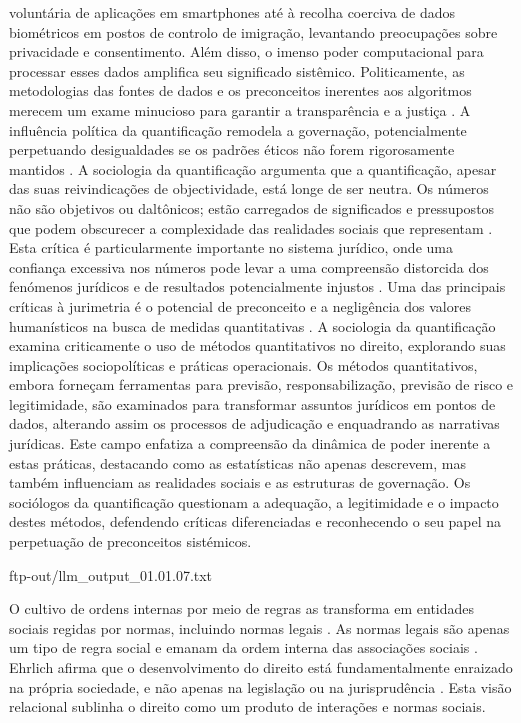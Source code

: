 voluntária de aplicações em smartphones até à recolha coerciva de dados biométricos em postos de controlo de imigração, levantando preocupações sobre privacidade e consentimento. Além disso, o imenso poder computacional para processar esses dados amplifica seu significado sistêmico. Politicamente, as metodologias das fontes de dados e os preconceitos inerentes aos algoritmos merecem um exame minucioso para garantir a transparência e a justiça \cite{sareen2020}. A influência política da quantificação remodela a governação, potencialmente perpetuando desigualdades se os padrões éticos não forem rigorosamente mantidos \cite{camargo2022}. A sociologia da quantificação argumenta que a quantificação, apesar das suas reivindicações de objectividade, está longe de ser neutra. Os números não são objetivos ou daltônicos; estão carregados de significados e pressupostos que podem obscurecer a complexidade das realidades sociais que representam \cite{10.5040/9781350220645,10.1590/dados.2022.65.3.267}. Esta crítica é particularmente importante no sistema jurídico, onde uma confiança excessiva nos números pode levar a uma compreensão distorcida dos fenómenos jurídicos e de resultados potencialmente injustos \cite{10.1057/s41599-020-00557-0,de2010jurimetrics}. Uma das principais críticas à jurimetria é o potencial de preconceito e a negligência dos valores humanísticos na busca de medidas quantitativas \cite{10.1177/09596801221075807,de2010jurimetrics}. A sociologia da quantificação examina criticamente o uso de métodos quantitativos no direito, explorando suas implicações sociopolíticas e práticas operacionais. Os métodos quantitativos, embora forneçam ferramentas para previsão, responsabilização, previsão de risco e legitimidade, são examinados para transformar assuntos jurídicos em pontos de dados, alterando assim os processos de adjudicação e enquadrando as narrativas jurídicas. Este campo enfatiza a compreensão da dinâmica de poder inerente a estas práticas, destacando como as estatísticas não apenas descrevem, mas também influenciam as realidades sociais e as estruturas de governação. Os sociólogos da quantificação questionam a adequação, a legitimidade e o impacto destes métodos, defendendo críticas diferenciadas e reconhecendo o seu papel na perpetuação de preconceitos sistémicos. 

ftp-out/llm_output_01.01.07.txt 

O cultivo de ordens internas por meio de regras as transforma em entidades sociais regidas por normas, incluindo normas legais \cite{venturini2024}. As normas legais são apenas um tipo de regra social e emanam da ordem interna das associações sociais \cite{venturini2024, venturini2024b}. Ehrlich afirma que o desenvolvimento do direito está fundamentalmente enraizado na própria sociedade, e não apenas na legislação ou na jurisprudência \cite{venturini2024c}. Esta visão relacional sublinha o direito como um produto de interações e normas sociais. 

